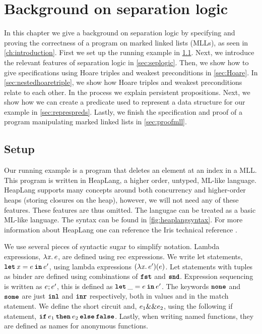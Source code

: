 \documentclass[thesis.tex]{subfiles}
\begin{document}
\chapter{Background on separation logic}
\label{ch:backgroundseplogic}

In this chapter we give a background on separation logic by specifying and proving the correctness of a program on marked linked lists (MLLs), as seen in \cref{ch:introduction}. First we set up the running example in \cref{sec:irissetup}. Next, we introduce the relevant features of separation logic in \cref{sec:seplogic}. Then, we show how to give specifications using Hoare triples and weakest preconditions in \cref{sec:Hoare}. In \cref{sec:nestedhoaretriple}, we show how Hoare triples and weakest preconditions relate to each other. In the process we explain persistent propositions. Next, we show how we can create a predicate used to represent a data structure for our example in \cref{sec:represpreds}. Lastly, we finish the specification and proof of a program manipulating marked linked lists in \cref{sec:proofmll}.

\section{Setup}
\label{sec:irissetup}
Our running example is a program that deletes an element at an index in a MLL. This program is written in HeapLang, a higher order, untyped, ML-like language. HeapLang supports many concepts around both concurrency and higher-order heaps (storing closures on the heap), however, we will not need any of these features. These features are thus omitted. The langugae can be treated as a basic ML-like language. The syntax can be found in \cref{fig:heaplangsyntax}. For more information about HeapLang one can reference the Iris technical reference \cite*{iristeamIrisReference2023}.

We use several pieces of syntactic sugar to simplify notation. Lambda expressions, $\Lam \lvar. \expr$, are defined using rec expressions. We write let statements, $\Let \lvar = \expr in \expr'$, using lambda expressions $(\Lam \lvar. \expr')(\expr)$. Let statements with tuples as binder are defined using combinations of $\operatorname{\texttt{\upshape \bfseries fst}}$ and $\operatorname{\texttt{\upshape \bfseries snd}}$. Expression sequencing is written as $e; e'$, this is defined as $\Let \_ = \expr in \expr'$. The keywords $\operatorname{\texttt{\upshape \bfseries none}}$ and $\operatorname{\texttt{\upshape \bfseries some}}$ are just $\operatorname{\texttt{\upshape \bfseries inl}}$ and $\operatorname{\texttt{\upshape \bfseries inr}}$ respectively, both in values and in the match statement. We define the short circuit and, $e_1 \&\& e_2$, using the following if statement, $\If \expr_1 then \expr_2 \Else \False$. Lastly, when writing named functions, they are defined as names for anonymous functions.
\end{document}
